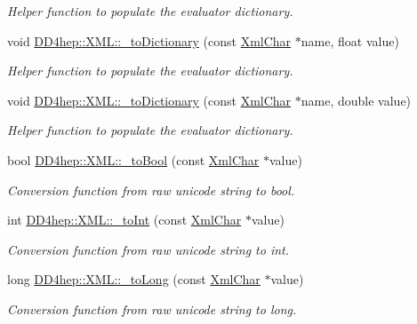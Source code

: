 \begin{DoxyCompactItemize}
\begin{DoxyCompactList}\small\item\em Helper function to populate the evaluator dictionary. \end{DoxyCompactList}\item 
void \hyperlink{group___d_d4_h_e_p___x_m_l_gac7be63582e2bd7ad2bad66544cb45ede}{D\+D4hep\+::\+X\+M\+L\+::\+\_\+to\+Dictionary} (const \hyperlink{namespace_d_d4hep_1_1_x_m_l_a09e5d9cc86ed782f6826dfe0778c1815}{Xml\+Char} $\ast$name, float value)
\begin{DoxyCompactList}\small\item\em Helper function to populate the evaluator dictionary. \end{DoxyCompactList}\item 
void \hyperlink{group___d_d4_h_e_p___x_m_l_ga7a346eee87fe45320da3ebb2e1958af5}{D\+D4hep\+::\+X\+M\+L\+::\+\_\+to\+Dictionary} (const \hyperlink{namespace_d_d4hep_1_1_x_m_l_a09e5d9cc86ed782f6826dfe0778c1815}{Xml\+Char} $\ast$name, double value)
\begin{DoxyCompactList}\small\item\em Helper function to populate the evaluator dictionary. \end{DoxyCompactList}\item 
bool \hyperlink{group___d_d4_h_e_p___x_m_l_ga4f06ff5f1ca607223cda870587170546}{D\+D4hep\+::\+X\+M\+L\+::\+\_\+to\+Bool} (const \hyperlink{namespace_d_d4hep_1_1_x_m_l_a09e5d9cc86ed782f6826dfe0778c1815}{Xml\+Char} $\ast$value)
\begin{DoxyCompactList}\small\item\em Conversion function from raw unicode string to bool. \end{DoxyCompactList}\item 
int \hyperlink{group___d_d4_h_e_p___x_m_l_ga8b2fbc55c4631087c0c5e905327f04d0}{D\+D4hep\+::\+X\+M\+L\+::\+\_\+to\+Int} (const \hyperlink{namespace_d_d4hep_1_1_x_m_l_a09e5d9cc86ed782f6826dfe0778c1815}{Xml\+Char} $\ast$value)
\begin{DoxyCompactList}\small\item\em Conversion function from raw unicode string to int. \end{DoxyCompactList}\item 
long \hyperlink{group___d_d4_h_e_p___x_m_l_ga0da6cdd75009487075f485c74a034a7b}{D\+D4hep\+::\+X\+M\+L\+::\+\_\+to\+Long} (const \hyperlink{namespace_d_d4hep_1_1_x_m_l_a09e5d9cc86ed782f6826dfe0778c1815}{Xml\+Char} $\ast$value)
\begin{DoxyCompactList}\small\item\em Conversion function from raw unicode string to long. \end{DoxyCompactList}\item 

\end{DoxyCompactItemize}
